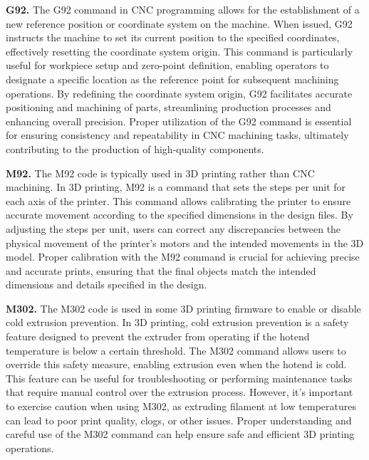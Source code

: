 \noindent\textbf{G92.}
The G92 command in CNC programming allows for the establishment of a new reference position or coordinate system on the machine. When issued, G92 instructs the machine to set its current position to the specified coordinates, effectively resetting the coordinate system origin. This command is particularly useful for workpiece setup and zero-point definition, enabling operators to designate a specific location as the reference point for subsequent machining operations. By redefining the coordinate system origin, G92 facilitates accurate positioning and machining of parts, streamlining production processes and enhancing overall precision. Proper utilization of the G92 command is essential for ensuring consistency and repeatability in CNC machining tasks, ultimately contributing to the production of high-quality components.

\noindent\textbf{M92.}
The M92 code is typically used in 3D printing rather than CNC machining. In 3D printing, M92 is a command that sets the steps per unit for each axis of the printer. This command allows calibrating the printer to ensure accurate movement according to the specified dimensions in the design files. By adjusting the steps per unit, users can correct any discrepancies between the physical movement of the printer's motors and the intended movements in the 3D model. Proper calibration with the M92 command is crucial for achieving precise and accurate prints, ensuring that the final objects match the intended dimensions and details specified in the design.



\noindent\textbf{M302.}
The M302 code is used in some 3D printing firmware to enable or disable cold extrusion prevention. In 3D printing, cold extrusion prevention is a safety feature designed to prevent the extruder from operating if the hotend temperature is below a certain threshold. The M302 command allows users to override this safety measure, enabling extrusion even when the hotend is cold. This feature can be useful for troubleshooting or performing maintenance tasks that require manual control over the extrusion process. However, it's important to exercise caution when using M302, as extruding filament at low temperatures can lead to poor print quality, clogs, or other issues. Proper understanding and careful use of the M302 command can help ensure safe and efficient 3D printing operations.


